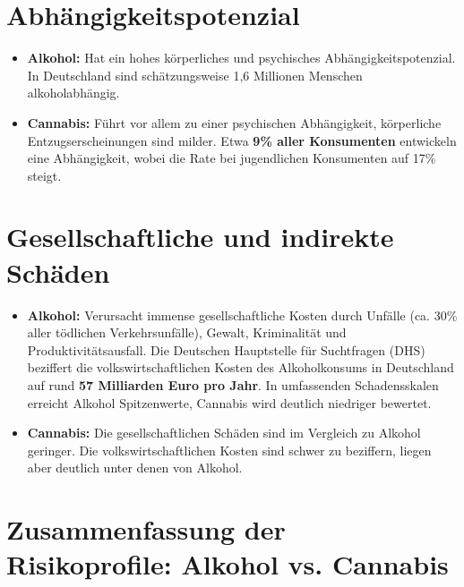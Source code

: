 \documentclass[11pt,a4paper]{article}
\begin{document}
	\section{Abhängigkeitspotenzial}
	
	\begin{itemize}[leftmargin=*, noitemsep]
		\item \textbf{Alkohol:} Hat ein hohes körperliches und psychisches Abhängigkeitspotenzial. In Deutschland sind schätzungsweise 1,6 Millionen Menschen alkoholabhängig\cite{dhs-abhaengigkeit}.
		\item \textbf{Cannabis:} Führt vor allem zu einer psychischen Abhängigkeit, körperliche Entzugserscheinungen sind milder. Etwa \textbf{9\% aller Konsumenten} entwickeln eine Abhängigkeit, wobei die Rate bei jugendlichen Konsumenten auf 17\% steigt\cite{dhs-cannabis-abhaengigkeit}.
	\end{itemize}
	
	\section{Gesellschaftliche und indirekte Schäden}
	
	\begin{itemize}[leftmargin=*, noitemsep]
		\item \textbf{Alkohol:} Verursacht immense gesellschaftliche Kosten durch Unfälle (ca. 30\% aller tödlichen Verkehrsunfälle), Gewalt, Kriminalität und Produktivitätsausfall. Die Deutschen Hauptstelle für Suchtfragen (DHS) beziffert die volkswirtschaftlichen Kosten des Alkoholkonsums in Deutschland auf rund \textbf{57 Milliarden Euro pro Jahr}\cite{dhs-costs}. In umfassenden Schadensskalen erreicht Alkohol Spitzenwerte, Cannabis wird deutlich niedriger bewertet.
		\item \textbf{Cannabis:} Die gesellschaftlichen Schäden sind im Vergleich zu Alkohol geringer. Die volkswirtschaftlichen Kosten sind schwer zu beziffern, liegen aber deutlich unter denen von Alkohol.
	\end{itemize}
	
	\section{Zusammenfassung der Risikoprofile: Alkohol vs. Cannabis}
	
\end{document}
